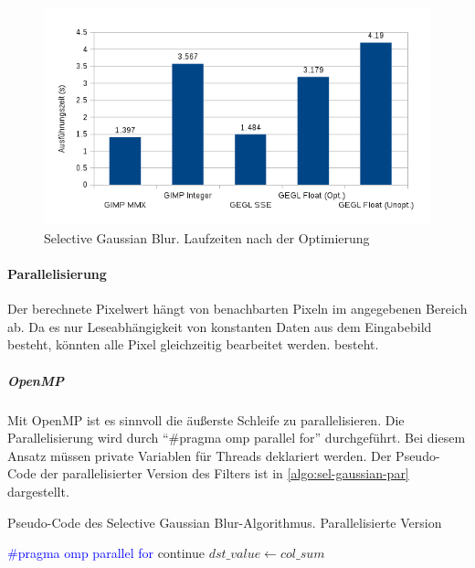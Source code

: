 \begin{figure}
\centering
\includegraphics[scale=0.75]{graphs/sgb-graph-2.png}
\caption{Selective Gaussian Blur. Laufzeiten nach der Optimierung}
\label{fig:sgb-graph-2}
\end{figure} 
 

\paragraph{Parallelisierung} 
Der berechnete Pixelwert hängt von benachbarten Pixeln im angegebenen Bereich ab. Da es nur Leseabhängigkeit von konstanten Daten aus dem Eingabebild besteht, könnten alle Pixel gleichzeitig bearbeitet werden.
besteht.

\subparagraph{OpenMP}
Mit OpenMP ist es sinnvoll die äußerste Schleife zu parallelisieren. Die Parallelisierung wird durch ``\#pragma omp parallel for'' durchgeführt.  Bei diesem Ansatz müssen private Variablen für Threads deklariert werden. Der Pseudo-Code der parallelisierter Version des Filters ist in \autoref{algo:sel-gaussian-par} dargestellt.

\begin{algorithm}[h]
\caption{Pseudo-Code des \glqq Selective Gaussian Blur\grqq-Algorithmus. Parallelisierte Version}
\label{algo:sel-gaussian-par}
\begin{algorithmic}[1]
\State \textcolor{blue}{\#pragma omp parallel for }
			\State continue
			\EndIf
				\EndIf
			\EndFor
		\EndFor
		\State $dst\_value \gets col\_sum$
	\EndFor
\EndFor	
\end{algorithmic}
\end{algorithm}